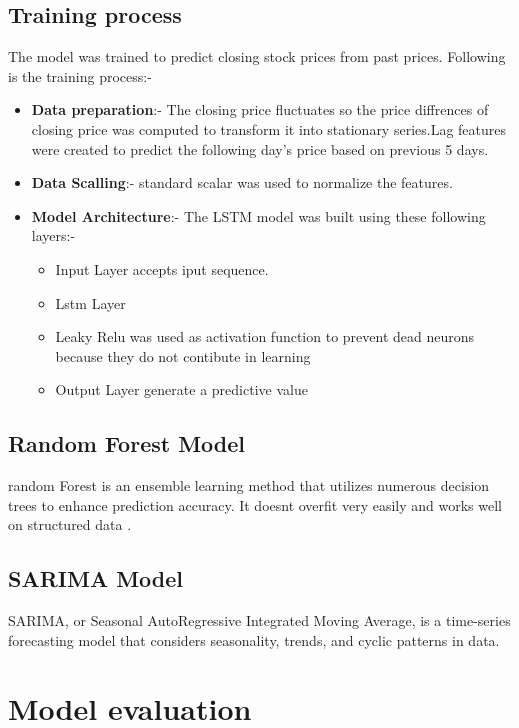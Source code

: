 \subsection{Training process}
The model was trained to predict closing stock prices from past prices. Following is the training process:- 
    \begin{itemize}
        \item \textbf{Data preparation}:- The closing price fluctuates so the price diffrences of closing price was computed to transform it into stationary series.Lag features were created to predict the following day's price based on previous 5 days.
        \item \textbf{Data Scalling}:- standard scalar was used to normalize the features.
        \item \textbf{Model Architecture}:- The LSTM model was built using these following layers:-
        \begin{itemize}
            \item Input Layer accepts iput sequence.
            \item Lstm Layer
            \item Leaky Relu was used as activation function to prevent dead neurons because they do not contibute in learning
            \item Output Layer generate a predictive value 
        \end{itemize}
    \end{itemize}

\subsection{Random Forest Model}
random Forest is an ensemble learning method that utilizes numerous decision trees to enhance prediction accuracy. It doesnt overfit very easily and works well on structured data .

\subsection{SARIMA Model}
SARIMA, or Seasonal AutoRegressive Integrated Moving Average, is a time-series forecasting model that considers seasonality, trends, and cyclic patterns in data.

\section{Model evaluation}

